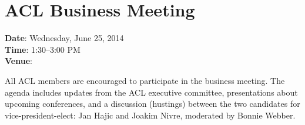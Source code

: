 \section[ACL Business Meeting]{ACL Business Meeting}
\thispagestyle{emptyheader}

\textbf{Date}: Wednesday, June 25, 2014 \\
\textbf{Time}: 1:30--3:00 PM \\
\textbf{Venue}: \BusinessMeetingLoc

All ACL members are encouraged to participate in the business
meeting. The agenda includes updates from the ACL executive committee,
presentations about upcoming conferences, and a discussion
(hustings) between the two candidates for vice-president-elect: Jan
Hajic and Joakim Nivre, moderated by Bonnie Webber.

